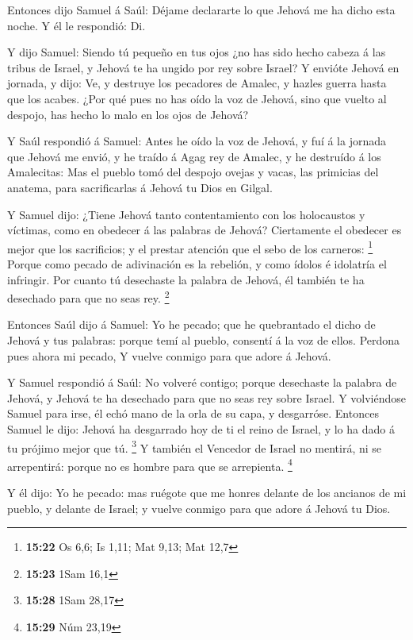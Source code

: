  Entonces dijo Samuel á Saúl: Déjame declararte lo que
Jehová me ha dicho esta noche. Y él le respondió: Di.

 Y dijo Samuel: Siendo tú pequeño en tus ojos ¿no has
sido hecho cabeza á las tribus de Israel, y Jehová te ha ungido por rey
sobre Israel?  Y envióte Jehová en jornada, y dijo: Ve, y
destruye los pecadores de Amalec, y hazles guerra hasta que los acabes.
 ¿Por qué pues no has oído la voz de Jehová, sino que
vuelto al despojo, has hecho lo malo en los ojos de Jehová?

 Y Saúl respondió á Samuel: Antes he oído la voz de
Jehová, y fuí á la jornada que Jehová me envió, y he traído á Agag rey
de Amalec, y he destruído á los Amalecitas:  Mas el
pueblo tomó del despojo ovejas y vacas, las primicias del anatema, para
sacrificarlas á Jehová tu Dios en Gilgal.

 Y Samuel dijo: ¿Tiene Jehová tanto contentamiento con
los holocaustos y víctimas, como en obedecer á las palabras de Jehová?
Ciertamente el obedecer es mejor que los sacrificios; y el prestar
atención que el sebo de los carneros: \footnote{\textbf{15:22} Os 6,6;
  Is 1,11; Mat 9,13; Mat 12,7}  Porque como pecado de
adivinación es la rebelión, y como ídolos é idolatría el infringir. Por
cuanto tú desechaste la palabra de Jehová, él también te ha desechado
para que no seas rey. \footnote{\textbf{15:23} 1Sam 16,1}

 Entonces Saúl dijo á Samuel: Yo he pecado; que he
quebrantado el dicho de Jehová y tus palabras: porque temí al pueblo,
consentí á la voz de ellos. Perdona pues ahora mi pecado,
 Y vuelve conmigo para que adore á Jehová.

 Y Samuel respondió á Saúl: No volveré contigo; porque
desechaste la palabra de Jehová, y Jehová te ha desechado para que no
seas rey sobre Israel.  Y volviéndose Samuel para irse,
él echó mano de la orla de su capa, y desgarróse. 
Entonces Samuel le dijo: Jehová ha desgarrado hoy de ti el reino de
Israel, y lo ha dado á tu prójimo mejor que tú. \footnote{\textbf{15:28}
  1Sam 28,17}  Y también el Vencedor de Israel no
mentirá, ni se arrepentirá: porque no es hombre para que se arrepienta.
\footnote{\textbf{15:29} Núm 23,19}

 Y él dijo: Yo he pecado: mas ruégote que me honres
delante de los ancianos de mi pueblo, y delante de Israel; y vuelve
conmigo para que adore á Jehová tu Dios.

